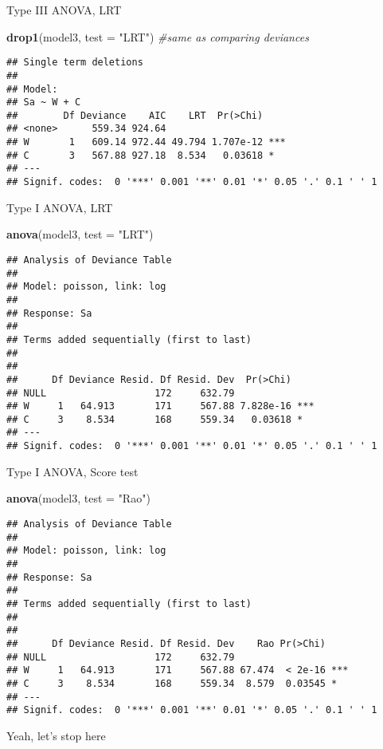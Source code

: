 \documentclass[
  ignorenonframetext,
]{beamer}
\newenvironment{Shaded}{\begin{snugshade}}{\end{snugshade}}
\newcommand{\AttributeTok}[1]{\textcolor[rgb]{0.13,0.29,0.53}{#1}}
\newcommand{\CommentTok}[1]{\textcolor[rgb]{0.56,0.35,0.01}{\textit{#1}}}
\newcommand{\FunctionTok}[1]{\textcolor[rgb]{0.13,0.29,0.53}{\textbf{#1}}}
\newcommand{\NormalTok}[1]{#1}
\newcommand{\StringTok}[1]{\textcolor[rgb]{0.31,0.60,0.02}{#1}}
\begin{document}
\begin{frame}[fragile]{Type III ANOVA, LRT}
\label{type-iii-anova-lrt}
\begin{Shaded}
\begin{Highlighting}[]
\FunctionTok{drop1}\NormalTok{(model3, }\AttributeTok{test =} \StringTok{"LRT"}\NormalTok{)  }\CommentTok{\#same as comparing deviances}
\end{Highlighting}
\end{Shaded}

\begin{verbatim}
## Single term deletions
## 
## Model:
## Sa ~ W + C
##        Df Deviance    AIC    LRT  Pr(>Chi)    
## <none>      559.34 924.64                     
## W       1   609.14 972.44 49.794 1.707e-12 ***
## C       3   567.88 927.18  8.534   0.03618 *  
## ---
## Signif. codes:  0 '***' 0.001 '**' 0.01 '*' 0.05 '.' 0.1 ' ' 1
\end{verbatim}
\end{frame}

\begin{frame}[fragile]{Type I ANOVA, LRT}
\label{type-i-anova-lrt}
\begin{Shaded}
\begin{Highlighting}[]
\FunctionTok{anova}\NormalTok{(model3, }\AttributeTok{test =} \StringTok{"LRT"}\NormalTok{)}
\end{Highlighting}
\end{Shaded}

\begin{verbatim}
## Analysis of Deviance Table
## 
## Model: poisson, link: log
## 
## Response: Sa
## 
## Terms added sequentially (first to last)
## 
## 
##      Df Deviance Resid. Df Resid. Dev  Pr(>Chi)    
## NULL                   172     632.79              
## W     1   64.913       171     567.88 7.828e-16 ***
## C     3    8.534       168     559.34   0.03618 *  
## ---
## Signif. codes:  0 '***' 0.001 '**' 0.01 '*' 0.05 '.' 0.1 ' ' 1
\end{verbatim}
\end{frame}

\begin{frame}[fragile]{Type I ANOVA, Score test}
\label{type-i-anova-score-test}
\begin{Shaded}
\begin{Highlighting}[]
\FunctionTok{anova}\NormalTok{(model3, }\AttributeTok{test =} \StringTok{"Rao"}\NormalTok{)}
\end{Highlighting}
\end{Shaded}

\begin{verbatim}
## Analysis of Deviance Table
## 
## Model: poisson, link: log
## 
## Response: Sa
## 
## Terms added sequentially (first to last)
## 
## 
##      Df Deviance Resid. Df Resid. Dev    Rao Pr(>Chi)    
## NULL                   172     632.79                    
## W     1   64.913       171     567.88 67.474  < 2e-16 ***
## C     3    8.534       168     559.34  8.579  0.03545 *  
## ---
## Signif. codes:  0 '***' 0.001 '**' 0.01 '*' 0.05 '.' 0.1 ' ' 1
\end{verbatim}
\end{frame}

\begin{frame}
Yeah, let's stop here
\end{frame}
\end{document}
